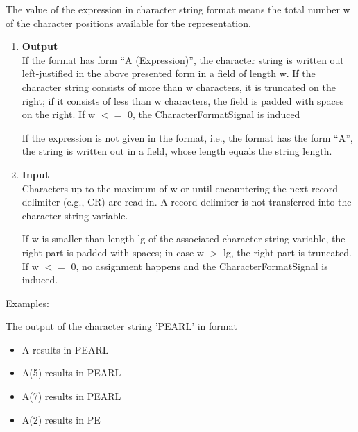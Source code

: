 The value of the expression in character string format means the total
number w of the character positions available for the representation.
\begin{enumerate}
\item {\bf Output}\\
If the format has form ``A (Expression)'', the character string is
written out left-justified in the above presented form in a field of
length w. If the character string consists of more than w characters, it
is truncated on the right; if it consists of less than w characters, the
field is padded with spaces on the right. 
If w $<=$ 0, the CharacterFormatSignal is induced

If the expression is not given in the format, i.e., the format has the
form ``A'', the string is written out in a field, whose length equals
the string length.
\item {\bf Input}\\
Characters up to the maximum of w or until encountering the next record
delimiter (e.g., CR) are read in. A record delimiter is not transferred
into the character string variable.

If w is smaller than length lg of the associated character string
variable, the right part is padded with spaces; in case w $>$ lg, the
right part is truncated.
 If w $<=$ 0, no assignment happens and the CharacterFormatSignal is 
   induced. 
\end{enumerate}

Examples:

The output of the character string 'PEARL' in format

\begin{itemize}
\item A    results in PEARL 
\item A(5) results in PEARL 
\item A(7) results in PEARL\_\_ 
\item A(2) results in PE
\end{itemize}

